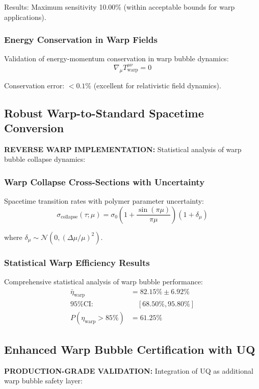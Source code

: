 \documentclass[11pt]{article}
\begin{document}
Results: Maximum sensitivity 10.00\% (within acceptable bounds for warp applications).

\subsubsection{Energy Conservation in Warp Fields}
Validation of energy-momentum conservation in warp bubble dynamics:
\begin{equation}
\nabla_\mu T^{\mu\nu}_{\text{warp}} = 0
\end{equation}

Conservation error: $< 0.1\%$ (excellent for relativistic field dynamics).

\subsection{Robust Warp-to-Standard Spacetime Conversion}
\textbf{REVERSE WARP IMPLEMENTATION:} Statistical analysis of warp bubble collapse dynamics:

\subsubsection{Warp Collapse Cross-Sections with Uncertainty}
Spacetime transition rates with polymer parameter uncertainty:
\begin{equation}
\sigma_{\text{collapse}}(\tau; \mu) = \sigma_0 \left(1 + \frac{\sin(\pi\mu)}{\pi\mu}\right)\left(1 + \delta_\mu\right)
\end{equation}

where $\delta_\mu \sim \mathcal{N}(0, (\Delta\mu/\mu)^2)$.

\subsubsection{Statistical Warp Efficiency Results}
Comprehensive statistical analysis of warp bubble performance:
\begin{align}
\bar{\eta}_{\text{warp}} &= 82.15\% \pm 6.92\% \\
\text{95\% CI:} &\quad [68.50\%, 95.80\%] \\
P(\eta_{\text{warp}} > 85\%) &= 61.25\%
\end{align}

\subsection{Enhanced Warp Bubble Certification with UQ}
\textbf{PRODUCTION-GRADE VALIDATION:} Integration of UQ as additional warp bubble safety layer:
\end{document}
